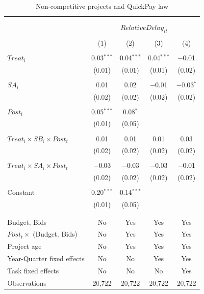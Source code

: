 \documentclass[
]{article}
\begin{document}
\begin{table}[H] \centering 
  \caption{Non-competitive projects and QuickPay law} 
  \label{} 
\small 
\begin{tabular}{@{\extracolsep{-2pt}}lcccc} 
\\[-1.8ex]\hline 
\hline \\[-1.8ex] 
\\[-1.8ex] & \multicolumn{4}{c}{$RelativeDelay_{it}$} \\ 
\\[-1.8ex] & (1) & (2) & (3) & (4)\\ 
\hline \\[-1.8ex] 
 $Treat_i$ & 0.03$^{***}$ & 0.04$^{***}$ & 0.04$^{***}$ & $-$0.01 \\ 
  & (0.01) & (0.01) & (0.01) & (0.02) \\ 
  & & & & \\ 
 $SA_i$ & 0.01 & 0.02 & $-$0.01 & $-$0.03$^{*}$ \\ 
  & (0.02) & (0.02) & (0.02) & (0.02) \\ 
  & & & & \\ 
 $Post_t$ & 0.05$^{***}$ & 0.08$^{*}$ &  &  \\ 
  & (0.01) & (0.05) &  &  \\ 
  & & & & \\ 
 $Treat_i \times SB_i \times Post_t$ & 0.01 & 0.01 & 0.01 & 0.03 \\ 
  & (0.02) & (0.02) & (0.02) & (0.02) \\ 
  & & & & \\ 
 $Treat_i \times SA_i \times Post_t$ & $-$0.03 & $-$0.03 & $-$0.03 & $-$0.01 \\ 
  & (0.02) & (0.02) & (0.02) & (0.02) \\ 
  & & & & \\ 
 Constant & 0.20$^{***}$ & 0.14$^{***}$ &  &  \\ 
  & (0.01) & (0.05) &  &  \\ 
  & & & & \\ 
\hline \\[-1.8ex] 
Budget, Bids & No & Yes & Yes & Yes \\ 
$Post_t \times $  (Budget, Bids) & No & Yes & Yes & Yes \\ 
Project age & No & Yes & Yes & Yes \\ 
Year-Quarter fixed effects & No & No & Yes & Yes \\ 
Task fixed effects & No & No & No & Yes \\ 
Observations & 20,722 & 20,722 & 20,722 & 20,722 \\ 

\end{tabular}
\end{table}
\end{document}
